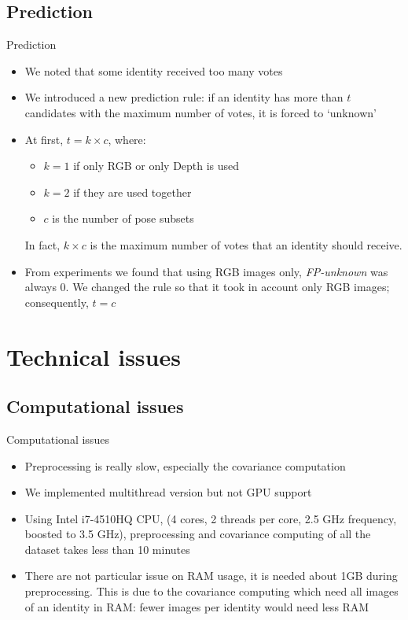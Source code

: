 \documentclass[unknownkeysallowed]{beamer}
\begin{document}
\subsection{Prediction}
\begin{frame}{Prediction}
	\begin{itemize}
		\item We noted that some identity received too many votes
		\item We introduced a new prediction rule: if an identity has
			more than $t$ candidates with the maximum number of
			votes, it is forced to `unknown'
		\item At first, $t=k \times c$, where:
			\begin{itemize}
				\item $k=1$ if only RGB or
					only Depth is used
				\item $k=2$ if they are used together
				\item $c$ is the number of pose subsets
			\end{itemize}
			In fact, $k \times c$ is the maximum number of votes
			that an identity should receive.
		\item From experiments we found that using RGB images only,
			\textit{FP-unknown} was always 0. We changed the rule
			so that it took in account only RGB images;
			consequently, $t = c$

	\end{itemize}
\end{frame}

\section{Technical issues}
\subsection{Computational issues}
\begin{frame}{Computational issues}
	\begin{itemize}
		\item Preprocessing is really slow, especially the covariance
			computation
		\item We implemented multithread version but not GPU support
		\item Using Intel i7-4510HQ CPU, (4 cores, 2 threads per core,
			2.5 GHz frequency, boosted to 3.5 GHz), preprocessing
			and covariance computing of all the dataset takes less than
			10 minutes
		\item There are not particular issue on RAM usage, it is needed
			about 1GB during preprocessing. This is due to the
			covariance computing which need all images of an
			identity in RAM: fewer images per identity would need
			less RAM
	\end{itemize}
\end{frame}
\end{document}
